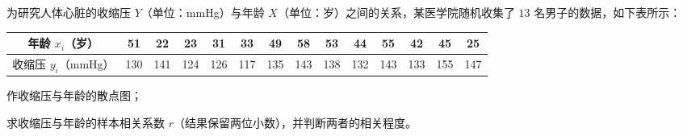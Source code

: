 \documentclass[12pt,a4paper]{exam-zh}
\begin{document}
\begin{question}
    为研究人体心脏的收缩压 $Y$（单位：mmHg）与年龄 $X$（单位：岁）之间的关系，某医学院随机收集了 $13$ 名男子的数据，如下表所示：
    \begin{center}
        \small
        \begin{tabular}{c|*{13}{c}}
            \hline
            年龄 $x_i$（岁）  & 51  & 22  & 23  & 31  & 33  & 49  & 58  & 53  & 44  & 55  & 42  & 45  & 25  \\
            \hline
            收缩压 $y_i$（mmHg） & 130 & 141 & 124 & 126 & 117 & 135 & 143 & 138 & 132 & 143 & 133 & 155 & 147 \\
            \hline
        \end{tabular}
    \end{center}

    \begin{questionparts}
        \item 作收缩压与年龄的散点图；

        \item 求收缩压与年龄的样本相关系数 $r$（结果保留两位小数），并判断两者的相关程度。
    \end{questionparts}
\end{question}
\end{document}
